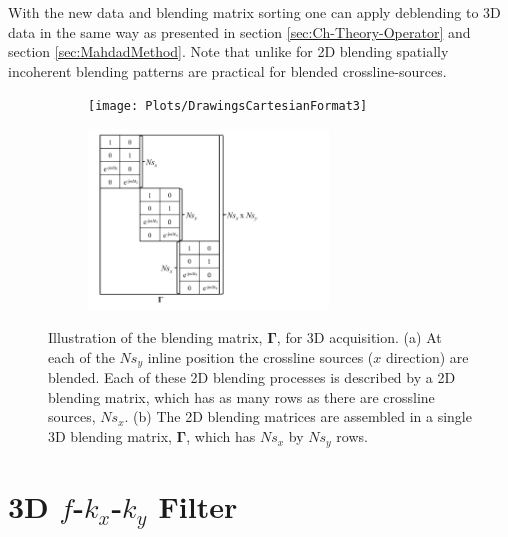 
With the new data and blending matrix sorting one can apply deblending to 3D data in the same way as presented in section \ref{sec:Ch-Theory-Operator} and section \ref{sec:MahdadMethod}. Note that unlike for 2D blending spatially incoherent blending patterns are practical for blended crossline-sources.

\begin{figure}

	\begin{subfigure}[t]{0.5\textwidth}
		\centering
		\texttt{[image: Plots/DrawingsCartesianFormat3]}
		\caption{}
		\label{fig:Ch-Theory-3D-BlendedAcquisition}
	\end{subfigure}
	\begin{subfigure}[t]{0.5\textwidth}
		\centering
		\includegraphics[width = 0.7\textwidth]{Plots/DrawingsCartesianFormat2}
		\caption{}
		\label{fig:Ch-Theory-3D-BlendingMatrix}
	\end{subfigure}
	
	\caption{Illustration of the blending matrix, $\mathbf{\Gamma}$, for 3D acquisition. (a) At each of the $Ns_y$ inline position the crossline sources ($x$ direction) are blended. Each of these 2D blending processes is described by a 2D blending matrix, which has as many rows as there are crossline sources, $Ns_x$. (b) The 2D blending matrices are assembled in a single 3D blending matrix, $\mathbf{\Gamma}$, which has $Ns_x$ by $Ns_y$ rows.}
	\label{fig:Ch-Theory-3D-BlendingMatrix-Design}

\end{figure}


\section{3D $f$-$k_x$-$k_y$ Filter} \label{sec:Ch-Theory-3dExtension-FKK}

